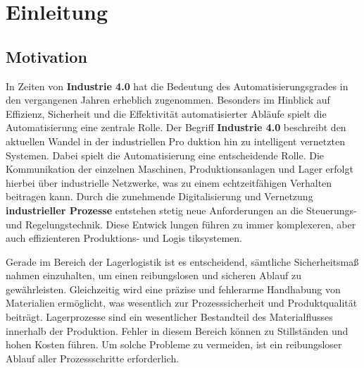 \section{Einleitung}

\subsection{Motivation}

    

    
In Zeiten von \textbf{Industrie 4.0} hat die Bedeutung des Automatisierungsgrades in den
vergangenen Jahren erheblich zugenommen.
Besonders im Hinblick auf Effizienz, Sicherheit und die Effektivität automatisierter Abläufe spielt die Automatisierung eine zentrale Rolle.
Der Begriff \textbf{Industrie 4.0} beschreibt den aktuellen Wandel in der industriellen Pro
duktion hin zu intelligent vernetzten Systemen. Dabei spielt die Automatisierung eine
entscheidende Rolle. Die Kommunikation der einzelnen Maschinen, Produktionsanlagen
und Lager erfolgt hierbei über industrielle Netzwerke, was zu einem echtzeitfähigen
Verhalten beitragen kann.
Durch die zunehmende Digitalisierung und Vernetzung \textbf{industrieller Prozesse} entstehen
stetig neue Anforderungen an die Steuerungs- und Regelungstechnik. Diese Entwick
lungen führen zu immer komplexeren, aber auch effizienteren Produktions- und Logis
tiksystemen.


Gerade im Bereich der Lagerlogistik ist es entscheidend, sämtliche Sicherheitsmaß
nahmen einzuhalten, um einen reibungslosen und sicheren Ablauf zu gewährleisten.
Gleichzeitig wird eine präzise und fehlerarme Handhabung von Materialien ermöglicht,
was wesentlich zur Prozesssicherheit und Produktqualität beiträgt. Lagerprozesse sind
ein wesentlicher Bestandteil des Materialflusses innerhalb der Produktion. Fehler in
diesem Bereich können zu Stillständen und hohen Kosten führen. Um solche Probleme
zu vermeiden, ist ein reibungsloser Ablauf aller Prozessschritte erforderlich.

